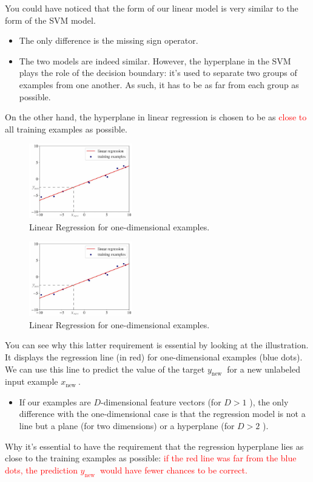 \documentclass[9pt,dvipsnames]{beamer}
\begin{document}
\begin{frame}
	You could have noticed that the form of our linear model is very similar to the form of the SVM model. 
	\begin{itemize}
		\item The only difference is the missing sign operator.
		\item The two models are indeed similar. However, the hyperplane in the SVM plays the role of the decision boundary: it's used to separate two groups of examples from one another. As such, it has to be as far from each group as possible.
	\end{itemize}
	On the other hand, the hyperplane in linear regression is chosen to be as \textcolor{red}{close to} all training examples as possible.
	\begin{figure}
		\centering
		\includegraphics[width=0.4\textwidth]{imgs/algorithm_1.jpg}
		\caption{Linear Regression for one-dimensional examples.}
	\end{figure}
\end{frame}
\begin{frame}
		\begin{figure}
		\centering
		\includegraphics[width=0.4\textwidth]{imgs/algorithm_1.jpg}
		\caption{Linear Regression for one-dimensional examples.}
	\end{figure}
	You can see why this latter requirement is essential by looking at the illustration. It displays the regression line (in red) for one-dimensional examples (blue dots). We can use this line to predict the value of the target $y_{\text {new }}$ for a new unlabeled input example $x_{\text {new }}$.
	\begin{itemize}
		\item If our examples are $D$-dimensional feature vectors (for $D>1$ ), the only difference with the one-dimensional case is that the regression model is not a line but a plane (for two dimensions) or a hyperplane (for $D>2$ ).
	\end{itemize}
	Why it's essential to have the requirement that the regression hyperplane lies as close to the training examples as possible: \textcolor{red}{if the red line was far from the blue dots, the prediction $y_{\text {new }}$ would have fewer chances to be correct.}
\end{frame}
\end{document}
